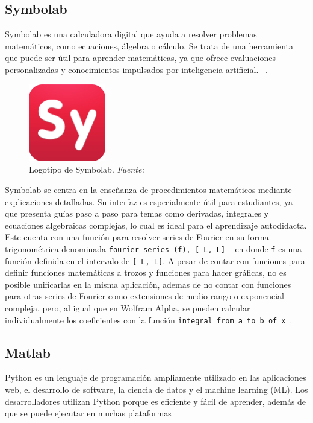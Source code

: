 \subsection{Symbolab}
Symbolab es una calculadora digital que ayuda a resolver problemas matemáticos, como ecuaciones, álgebra o cálculo. Se trata de una herramienta que puede ser útil para aprender matemáticas, ya que ofrece evaluaciones personalizadas y conocimientos impulsados por inteligencia artificial. ~\cite{symbolabDocs}. 
\begin{figure}[H]
	\centering
	\includegraphics[width=0.3\textwidth]{img/chapter02/logo_symbolab.png}
	\caption[Logotipo de Symbolab.]{Logotipo de Symbolab. \textit{Fuente: ~\cite{symbolabDocs}}}
	\label{fig:logo-symbolab}  %
\end{figure}
Symbolab se centra en la enseñanza de procedimientos matemáticos mediante explicaciones detalladas. Su interfaz es especialmente útil para estudiantes, ya que presenta guías paso a paso para temas como derivadas, integrales y ecuaciones algebraicas complejas, lo cual es ideal para el aprendizaje autodidacta. Este cuenta con una función para resolver series de Fourier en su forma trigonométrica denominada \texttt{fourier series (f), [-L, L]} ~\cite{symbolabDocs} en donde \texttt{f} es una función definida en el intervalo de \texttt{[-L, L]}. A pesar de contar con funciones para definir funciones matemáticas a trozos y funciones para hacer gráficas, no es posible unificarlas en la misma aplicación, ademas de no contar con funciones para otras series de Fourier como extensiones de medio rango o exponencial compleja, pero, al igual que en Wolfram Alpha, se pueden calcular individualmente los coeficientes con la función \texttt{integral from a to b of x}~\cite{symbolabDocs}.

\subsection{Matlab}
Python es un lenguaje de programación ampliamente utilizado en las aplicaciones web, el desarrollo de software, la ciencia de datos y el machine learning (ML). Los desarrolladores utilizan Python porque es eficiente y fácil de aprender, además de que se puede ejecutar en muchas plataformas

